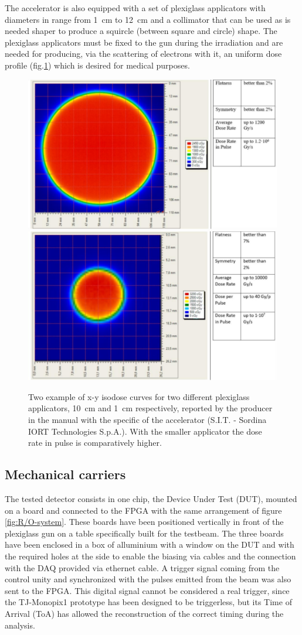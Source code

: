       The accelerator is also equipped with a set of plexiglass applicators with diameters in range from \SI{1}{cm} to \SI{12}{cm} and a collimator that can be used as is needed shaper to produce a squircle (between square and circle) shape.
      The plexiglass applicators must be fixed to the gun during the irradiation and are needed for producing, via the scattering of electrons with it, an uniform dose profile (fig.\ref{fig:dose_profile}) which is desired for medical purposes.
      \begin{figure}[h!]
         \centering
         \includegraphics[width=.49\linewidth]{figures/test_beam/dose_profile_10cm.pdf}
         \includegraphics[width=.49\linewidth]{figures/test_beam/dose_profile_1cm.pdf}
         \caption{Two example of x-y isodose curves for two different plexiglass applicators, \SI{10}{cm} and \SI{1}{cm} respectively, reported by the producer in the manual with the specific of the accelerator (S.I.T. - Sordina IORT Technologies S.p.A.). With the smaller applicator the dose rate in pulse is comparatively higher.}
         \label{fig:dose_profile}
      \end{figure}  

   \subsection{Mechanical carriers} 
      The tested detector consists in one chip, the Device Under Test (DUT), mounted on a board and connected to the FPGA with the same arrangement of figure \ref{fig:R/O-system}.
      These boards have been positioned vertically in front of the plexiglass gun on a table specifically built for the testbeam. The three boards have been enclosed in a box of alluminium with a window on the DUT and with the required holes at the side to enable the biasing via cables and the connection with the DAQ provided via ethernet cable.       
      A trigger signal coming from the control unity and synchronized with the pulses emitted from the beam was also sent to the FPGA.
      This digital signal cannot be considered a real trigger, since the TJ-Monopix1 prototype has been designed to be triggerless, but its Time of Arrival (ToA) has allowed the reconstruction of the correct timing during the analysis.

